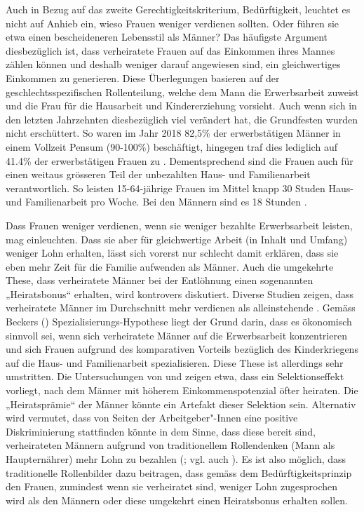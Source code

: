 \documentclass[a4paper,12pt]{article}
\renewcommand{\baselinestretch}{1.1}
\newif\ifcomments
\newcommand{\comment}[1]{%
    \ifcomments\marginpar{\renewcommand{\baselinestretch}{1}\tiny\hspace*{-1.1em}\colorbox{gray!20}%
    {\textcolor{red}{\parbox[t]{.9in}{\raggedright #1}}}}\fi}
\begin{document}
Auch in Bezug auf das zweite Gerechtigkeitskriterium, Bedürftigkeit, leuchtet
es nicht auf Anhieb ein, wieso Frauen weniger verdienen sollten. Oder führen
sie etwa einen bescheideneren Lebensstil als Männer? Das häufigste Argument
diesbezüglich ist, dass verheiratete Frauen auf das Einkommen ihres Mannes
zählen können und deshalb weniger darauf angewiesen sind, ein gleichwertiges
Einkommen zu generieren. Diese Überlegungen basieren auf der
geschlechtsspezifischen Rollenteilung, welche dem Mann die Erwerbsarbeit
zuweist und die Frau für die Hausarbeit und Kindererziehung vorsieht. Auch wenn
sich in den letzten Jahrzehnten diesbezüglich viel verändert hat, die
Grundfesten wurden nicht erschüttert. So waren im Jahr 2018 82,5\% der erwerbstätigen Männer in einem Vollzeit Pensum (90-100\%) beschäftigt, hingegen traf dies lediglich auf 41.4\% der erwerbstätigen Frauen zu \citep{BFS-2019d}.
Dementsprechend sind die Frauen auch für einen weitaus grösseren Teil der unbezahlten Haus- und Familienarbeit verantwortlich. So leisten 15-64-jährige Frauen im Mittel knapp 30 Studen Haus- und Familienarbeit pro Woche. Bei den Männern sind es 18 Stunden \citep{BFS-2017}. \comment{Hier evtl. etwas ergänzen.-> Habe ein paar Zahlen und Erläuterungen ergänzt. Macht das überhaupt Sinn hier?}
Dass Frauen weniger verdienen, wenn sie weniger bezahlte Erwerbsarbeit leisten, mag einleuchten. Dass sie aber für gleichwertige Arbeit (in Inhalt und Umfang) weniger Lohn erhalten, lässt sich vorerst nur schlecht damit erklären, dass sie eben mehr Zeit für die Familie aufwenden als Männer. Auch die umgekehrte These, dass verheiratete Männer bei der Entlöhnung einen sogenannten „Heiratsbonus“ erhalten, wird kontrovers diskutiert. \comment{die folgenden beiden Abschnitte sind aus dem Kapitel von Exp. 3 ausgeschnitten und verschoben worden.} Diverse Studien zeigen, dass verheiratete Männer im Durchschnitt mehr verdienen als alleinstehende
\citep{Budig-Lim-2016,Killewald-Gough-2013}. Gemäss Beckers
(\citeyear{Becker-1981}) Spezialisierungs-Hypothese liegt der Grund darin, dass
es ökonomisch sinnvoll sei, wenn sich verheiratete Männer auf die Erwerbsarbeit
konzentrieren und sich Frauen aufgrund des komparativen Vorteils bezüglich des
Kinderkriegens auf die Haus- und Familienarbeit spezialisieren. Diese These ist
allerdings sehr umstritten. Die Untersuchungen von \citet{Ludwig-Bruederl-2011}
und \citet{Jakobsson-Kotsadam-2016} zeigen etwa, dass ein Selektionseffekt
vorliegt, nach dem Männer mit höherem Einkommenspotenzial öfter heiraten. Die
„Heiratsprämie“ der Männer könnte ein Artefakt dieser Selektion sein.
Alternativ wird vermutet, dass von Seiten der Arbeitgeber"-Innen eine positive
Diskriminierung stattfinden könnte in dem Sinne, dass diese bereit sind,
verheirateten Männern aufgrund von traditionellem Rollendenken (Mann
als Haupternährer) mehr Lohn zu bezahlen (\citealp{Budig-Lim-2016}; vgl. auch
\citealp{Killewald-Gough-2013}). 
Es ist also möglich, dass traditionelle Rollenbilder dazu beitragen, dass gemäss dem Bedürftigkeitsprinzip den Frauen, zumindest wenn sie verheiratet sind, weniger Lohn zugesprochen wird als den Männern oder diese umgekehrt einen Heiratsbonus erhalten sollen.
\end{document}
